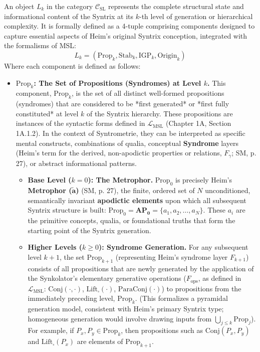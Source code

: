 \documentclass[
    12pt,              %
    a4paper,           %
    headings=normal,   %
    twoside=true,      %
    BCOR=8mm,          %
]{scrbook}
\newcommand{\metrophor}{\bm{\widetilde{a}}}
\newcommand{\syndrom}{F}
\newcommand{\LMSL}{\mathcal{L}_{\text{MSL}}}
\newcommand{\BoxSyn}{\square}
\newcommand{\APZero}{\mathbf{AP_0}}
\newcommand{\fops}{F_{\text{ops}}}
\begin{document}
An object \(L_k\) in the category \(\mathcal{C}_{\text{SL}}\) represents the complete structural state and informational content of the Syntrix at its \(k\)-th level of generation or hierarchical complexity. It is formally defined as a 4-tuple comprising components designed to capture essential aspects of Heim's original Syntrix conception, integrated with the formalisms of MSL:
\[L_k = ( \text{Prop}_k, \text{Stab}_k, \text{IGP}_k, \text{Origin}_k )\]
Where each component is defined as follows:

\begin{itemize}
    \item   \textbf{\(\text{Prop}_k\): The Set of Propositions (Syndromes) at Level \(k\).}
        This component, \(\text{Prop}_k\), is the set of all distinct well-formed propositions (syndromes) that are considered to be *first generated* or *first fully constituted* at level \(k\) of the Syntrix hierarchy. These propositions are instances of the syntactic forms defined in \(\LMSL\) (Chapter 1A, Section 1A.1.2). In the context of Syntrometrie, they can be interpreted as specific mental constructs, combinations of qualia, conceptual \textbf{Syndrome} layers (Heim's term for the derived, non-apodictic properties or relations, \(\syndrom_\gamma\); SM, p. 27), or abstract informational patterns.
        \begin{itemize}
            \item   \textbf{Base Level (\(k=0\)): The Metrophor.} \(\text{Prop}_0\) is precisely Heim's \textbf{Metrophor (\(\metrophor\))} (SM, p. 27), the finite, ordered set of \(N\) unconditioned, semantically invariant \textbf{apodictic elements} upon which all subsequent Syntrix structure is built: \(\text{Prop}_0 = \APZero = \{a_1, a_2, \ldots, a_N\}\). These \(a_i\) are the primitive concepts, qualia, or foundational truths that form the starting point of the Syntrix generation.
            \item   \textbf{Higher Levels (\(k \ge 0\)): Syndrome Generation.} For any subsequent level \(k+1\), the set \(\text{Prop}_{k+1}\) (representing Heim's syndrome layer \(\syndrom_{k+1}\)) consists of all propositions that are newly generated by the application of the Synkolator's elementary generative operations (\(\fops\), as defined in \(\LMSL\): \(\text{Conj}(\cdot,\cdot)\), \(\text{Lift}_\BoxSyn(\cdot)\), \(\text{ParaConj}(\cdot)\)) to propositions from the immediately preceding level, \(\text{Prop}_k\). (This formalizes a pyramidal generation model, consistent with Heim's primary Syntrix type; homogeneous generation would involve drawing inputs from \(\bigcup_{j \le k} \text{Prop}_j\)). For example, if \(P_x, P_y \in \text{Prop}_k\), then propositions such as \(\text{Conj}(P_x, P_y)\) and \(\text{Lift}_\BoxSyn(P_x)\) are elements of \(\text{Prop}_{k+1}\).
        \end{itemize}


\end{itemize}
\end{document}
